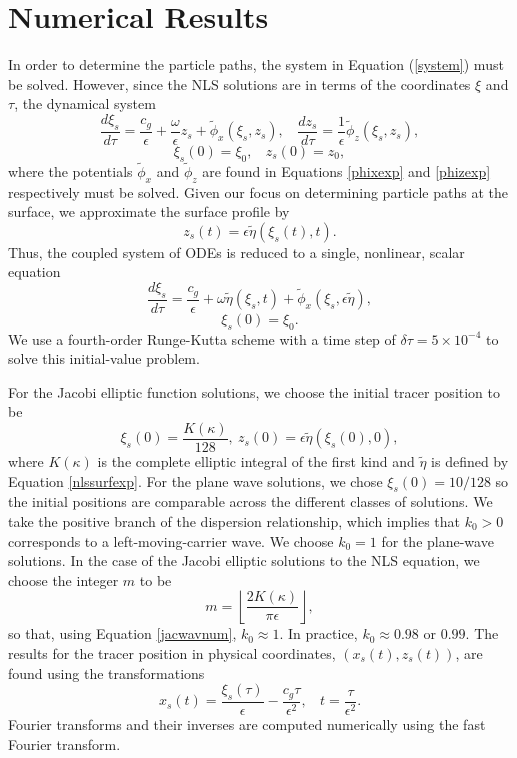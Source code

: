 \documentclass{JFM_Style/jfm}
\begin{document}
\section{Numerical Results}
In order to determine the particle paths, the system in Equation (\ref{system}) must be solved.  However, since the NLS solutions are in terms of the coordinates $\xi$ and $\tau$, the dynamical system
\[
\frac{d \xi_{s}}{d\tau} =  \frac{c_{g}}{\epsilon} + \frac{\omega}{\epsilon}z_{s} + \tilde{\phi}_{x}(\xi_{s},z_{s}), ~~~~ \frac{dz_{s}}{d\tau} = \frac{1}{\epsilon} \tilde{\phi}_{z}(\xi_{s},z_{s}),
\]
\[
\xi_s(0)=\xi_0, ~~~~ z_s(0)=z_0,
\]
where the potentials $\tilde{\phi}_{x}$ and $\tilde{\phi}_{z}$ are found in Equations \eqref{phixexp} and \eqref{phizexp} respectively must be solved.  Given our focus on determining particle paths at the surface, we approximate the surface profile by
\[
z_{s}(t) = \epsilon \tilde{\eta}(\xi_{s}(t),t). 
\]
Thus, the coupled system of ODEs is reduced to a single, nonlinear, scalar equation
\[
\frac{d \xi_{s}}{d\tau} =  \frac{c_{g}}{\epsilon} + \omega\tilde{\eta}(\xi_{s},t) + \tilde{\phi}_{x}(\xi_{s},\epsilon\tilde{\eta}),
\]
\[
\xi_s(0)=\xi_0.
\]
We use a fourth-order Runge-Kutta scheme with a time step of $\delta \tau = 5\times10^{-4}$ to solve this initial-value problem.  

For the Jacobi elliptic function solutions, we choose the initial tracer position to be 
\[
\xi_{s}(0) = \frac{K(\kappa)}{128}, ~ z_{s}(0) = \epsilon \tilde{\eta}(\xi_{s}(0),0),
\]
where $K(\kappa)$ is the complete elliptic integral of the first kind and $\tilde{\eta}$ is defined by Equation \eqref{nlssurfexp}.  For the plane wave solutions, we chose $\xi_s(0)=10/128$ so the initial positions are comparable across the different classes of solutions.  We take the positive branch of the dispersion relationship, which implies that $k_{0}>0$ corresponds to a left-moving-carrier wave.  We choose $k_{0}=1$ for the plane-wave solutions.  In the case of the Jacobi elliptic solutions to the NLS equation, we choose the integer $m$ to be 
\[
m = \left\lfloor \frac{2K(\kappa)}{\pi \epsilon}\right\rfloor,
\]
so that, using Equation \eqref{jacwavnum}, $k_{0}\approx 1$.  In practice, $k_{0}\approx0.98$ or $0.99$.  The results for the tracer position in physical coordinates, $(x_{s}(t),z_{s}(t))$, are found using the transformations 
\[
x_{s}(t) = \frac{\xi_{s}(\tau)}{\epsilon}-\frac{c_{g}\tau}{\epsilon^{2}}, ~~~~ t = \frac{\tau}{\epsilon^{2}}.
\]
Fourier transforms and their inverses are computed numerically using the fast Fourier transform. 
\end{document}
